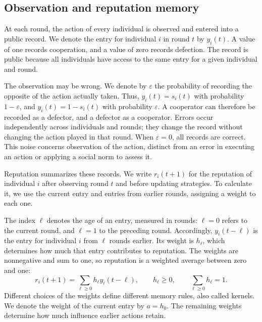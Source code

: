 \documentclass[physics,article,submit,moreauthors]{Definitions/mdpi}
\begin{document}
\subsection{Observation and reputation memory}
At each round, the action of every individual is observed and entered into a public record. We denote the entry for individual $i$ in round $t$ by $y_i(t)$. A value of one records cooperation, and a value of zero records defection. The record is public because all individuals have access to the same entry for a given individual and round.

The observation may be wrong. We denote by $\varepsilon$ the probability of recording the opposite of the action actually taken. Thus, $y_i(t)=s_i(t)$ with probability $1-\varepsilon$, and $y_i(t)=1-s_i(t)$ with probability $\varepsilon$. A cooperator can therefore be recorded as a defector, and a defector as a cooperator. Errors occur independently across individuals and rounds; they change the record without changing the action played in that round. When $\varepsilon=0$, all records are correct. This noise concerns observation of the action, distinct from an error in executing an action or applying a social norm to assess it.

Reputation summarizes these records. We write $r_i(t+1)$ for the reputation of individual $i$ after observing round $t$ and before updating strategies. To calculate it, we use the current entry and entries from earlier rounds, assigning a weight to each one.

The index $\ell$ denotes the age of an entry, measured in rounds: $\ell=0$ refers to the current round, and $\ell=1$ to the preceding round. Accordingly, $y_i(t-\ell)$ is the entry for individual $i$ from $\ell$ rounds earlier. Its weight is $h_\ell$, which determines how much that entry contributes to reputation. The weights are nonnegative and sum to one, so reputation is a weighted average between zero and one:
\begin{equation}
 r_i(t+1)=\sum_{\ell\geq0}h_\ell y_i(t-\ell),\qquad
 h_\ell\geq0,\qquad\sum_{\ell\geq0}h_\ell=1.
 \label{eq:reputation}
\end{equation}
Different choices of the weights define different memory rules, also called kernels. We denote the weight of the current entry by $a=h_0$. The remaining weights determine how much influence earlier actions retain.
\end{document}
